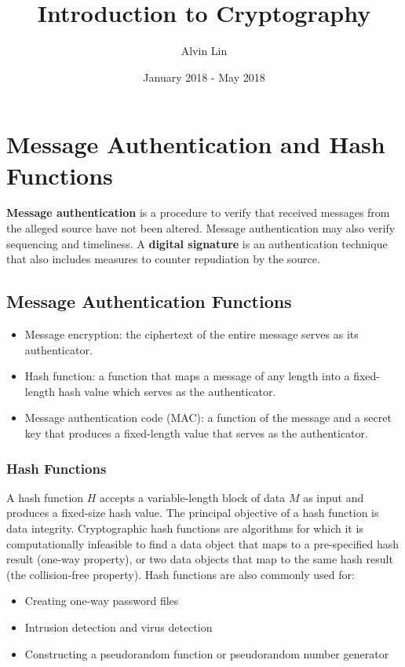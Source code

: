\documentclass{math}
\title{Introduction to Cryptography}
\author{Alvin Lin}
\date{January 2018 - May 2018}
\begin{document}
\maketitle

\section*{Message Authentication and Hash Functions}
\textbf{Message authentication} is a procedure to verify that received messages
from the alleged source have not been altered. Message authentication may also
verify sequencing and timeliness. A \textbf{digital signature} is an
authentication technique that also includes measures to counter repudiation by
the source.

\subsection*{Message Authentication Functions}
\begin{itemize}
  \item Message encryption: the ciphertext of the entire message serves as its
  authenticator.
  \item Hash function: a function that maps a message of any length into a
  fixed-length hash value which serves as the authenticator.
  \item Message authentication code (MAC): a function of the message and a
  secret key that produces a fixed-length value that serves as the
  authenticator.
\end{itemize}

\subsubsection*{Hash Functions}
A hash function \( H \) accepts a variable-length block of data \( M \) as input
and produces a fixed-size hash value. The principal objective of a hash function
is data integrity. Cryptographic hash functions are algorithms for which it is
computationally infeasible to find a data object that maps to a pre-specified
hash result (one-way property), or two data objects that map to the same hash
result (the collision-free property). Hash functions are also commonly used for:
\begin{itemize}
  \item Creating one-way password files
  \item Intrusion detection and virus detection
  \item Constructing a pseudorandom function or pseudorandom number generator
\end{itemize}
\end{document}
